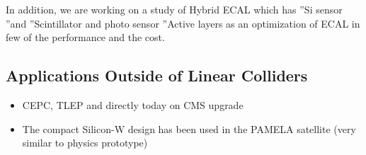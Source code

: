 In addition, we are working on a study of Hybrid ECAL which has ”Si sensor ”and ”Scintillator and photo sensor ”Active layers as an optimization of ECAL in few of the performance and the cost.

\subsection{Applications Outside of Linear Colliders}
\begin{itemize}
	\item CEPC, TLEP and directly today on CMS upgrade
	\item The compact Silicon-W design has been used in the PAMELA satellite (very similar to physics prototype)~\cite{1742-6596-160-1-012039}
\end{itemize}

